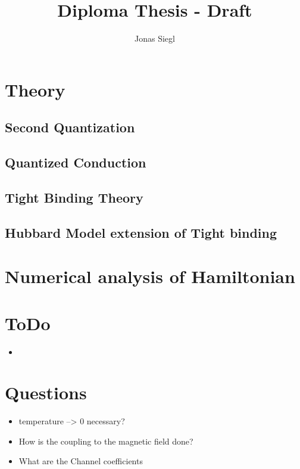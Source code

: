 \documentclass[12pt,twoside,a4paper]{report}
\author{Jonas Siegl}
\title{Diploma Thesis - Draft}
\numberwithin{equation}{section}
\begin{document}


\maketitle

\thispagestyle{plain}


\tableofcontents
\clearpage
\section{Theory}
\subsection{Second Quantization}
\subsection{Quantized Conduction}
\subsection{Tight Binding Theory}
\subsection{Hubbard Model extension of Tight binding}
\section{Numerical analysis of Hamiltonian}

\section{ToDo}
\begin{itemize}
  \item 
\end{itemize}
\section{Questions}

\begin{itemize}
  \item temperature --> 0 necessary?
  \item How is the coupling to the magnetic field done?
  \item What are the Channel coefficients
\end{itemize}
\end{document}
